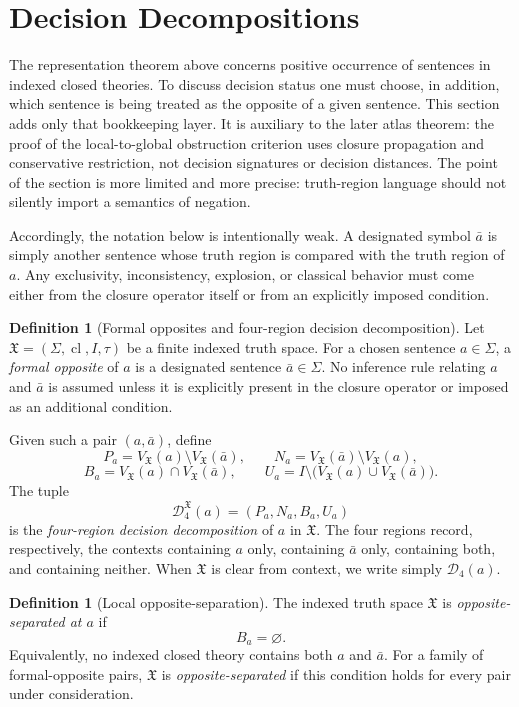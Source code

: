 \documentclass[11pt]{amsart}
\numberwithin{equation}{section}
\theoremstyle{plain}
\theoremstyle{definition}
\newtheorem{definition}[theorem]{Definition}
\theoremstyle{remark}
\newcommand{\Cl}{\operatorname{cl}}
\newcommand{\X}{\mathfrak X}
\newcommand{\Sig}{\Sigma}
\begin{document}
\section{Decision Decompositions}
\label{sec:decision-decompositions}

The representation theorem above concerns positive occurrence of sentences in indexed closed theories.  To discuss decision status one must choose, in addition, which sentence is being treated as the opposite of a given sentence.  This section adds only that bookkeeping layer.  It is auxiliary to the later atlas theorem: the proof of the local-to-global obstruction criterion uses closure propagation and conservative restriction, not decision signatures or decision distances.  The point of the section is more limited and more precise: truth-region language should not silently import a semantics of negation.

Accordingly, the notation below is intentionally weak.  A designated symbol \(\bar a\) is simply another sentence whose truth region is compared with the truth region of \(a\).  Any exclusivity, inconsistency, explosion, or classical behavior must come either from the closure operator itself or from an explicitly imposed condition.

\begin{definition}[Formal opposites and four-region decision decomposition]
\label{def:four-region-decomposition}
Let \(\X=(\Sig,\Cl,I,\tau)\) be a finite indexed truth space.  For a chosen sentence \(a\in\Sig\), a \emph{formal opposite} of \(a\) is a designated sentence \(\bar a\in\Sig\).  No inference rule relating \(a\) and \(\bar a\) is assumed unless it is explicitly present in the closure operator or imposed as an additional condition.

Given such a pair \((a,\bar a)\), define
\[
  P_a=V_{\X}(a)\setminus V_{\X}(\bar a),
  \qquad
  N_a=V_{\X}(\bar a)\setminus V_{\X}(a),
\]
\[
  B_a=V_{\X}(a)\cap V_{\X}(\bar a),
  \qquad
  U_a=I\setminus\bigl(V_{\X}(a)\cup V_{\X}(\bar a)\bigr).
\]
The tuple
\[
  \mathcal D_4^{\X}(a)=(P_a,N_a,B_a,U_a)
\]
is the \emph{four-region decision decomposition} of \(a\) in \(\X\).  The four regions record, respectively, the contexts containing \(a\) only, containing \(\bar a\) only, containing both, and containing neither.  When \(\X\) is clear from context, we write simply \(\mathcal D_4(a)\).
\end{definition}

\begin{definition}[Local opposite-separation]
\label{def:opposite-separation}
The indexed truth space \(\X\) is \emph{opposite-separated at \(a\)} if
\[
  B_a=\varnothing.
\]
Equivalently, no indexed closed theory contains both \(a\) and \(\bar a\).  For a family of formal-opposite pairs, \(\X\) is \emph{opposite-separated} if this condition holds for every pair under consideration.
\end{definition}
\end{document}
